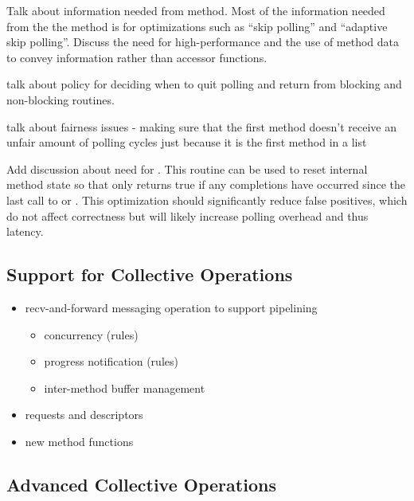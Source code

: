 \todo Talk about information needed from method.  Most of the information
needed from the the method is for optimizations such as ``skip polling'' and
``adaptive skip polling''.  Discuss the need for high-performance and the use
of method data to convey information rather than accessor functions.

\todo talk about policy for deciding when to quit polling and return from
blocking and non-blocking routines.

\todo talk about fairness issues - making sure that the first method doesn't
receive an unfair amount of polling cycles just because it is the first method
in a list

\todo Add discussion about need for .  This routine
can be used to reset internal method state so that  only
returns true if any completions have occurred since the last call to
 or .  This optimization should
significantly reduce false positives, which do not affect correctness but will
likely increase polling overhead and thus latency.


\subsection{Support for Collective Operations}

\begin{itemize}
\item recv-and-forward messaging operation to support pipelining
  \begin{itemize}
  \item concurrency (rules)
  \item progress notification (rules)
  \item inter-method buffer management
  \end{itemize}
\item requests and descriptors
\item new method functions
\end{itemize}


\subsection{Advanced Collective Operations}

